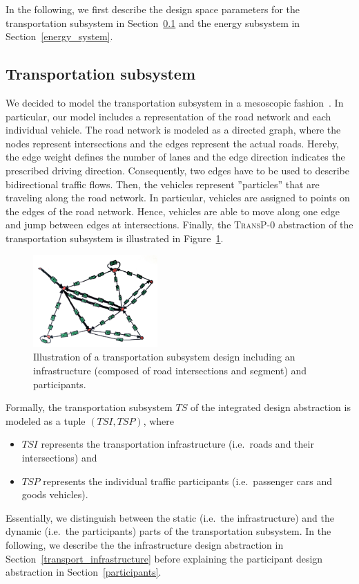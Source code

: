 In the following, we first describe the design space parameters for the transportation subsystem in Section~\ref{transport} and the energy subsystem in Section~\ref{energy_system}.

\subsection{Transportation subsystem}
\label{transport}

We decided to model the transportation subsystem in a mesoscopic fashion~\cite{?}. In particular, our model includes a representation of the road network and each individual vehicle. The road network is modeled as a directed graph, where the nodes represent intersections and the edges represent the actual roads. Hereby, the edge weight defines the number of lanes and the edge direction indicates the prescribed driving direction. Consequently, two edges have to be used to describe bidirectional traffic flows. Then, the vehicles represent ''particles'' that are traveling along the road network. In particular, vehicles are assigned to points on the edges of the road network. Hence, vehicles are able to move along one edge and jump between edges at intersections. Finally, the \textsc{TransP-0} abstraction of the transportation subsystem is illustrated in Figure~\ref{transport_illustration}.

\begin{figure}[h]
	\includegraphics[height=100pt, width=\columnwidth]{./gfx/transportation_system.jpg}
	\caption{Illustration of a transportation subsystem design including an infrastructure (composed of road intersections and segment) and participants.}
	\label{transport_illustration}
\end{figure}

Formally, the transportation subsystem $TS$ of the integrated design abstraction is modeled as a tuple $(TSI, TSP)$, where
\begin{itemize}
	\item $TSI$ represents the transportation infrastructure (i.e.\ roads and their intersections) and
	\item $TSP$ represents the individual traffic participants (i.e.\ passenger cars and goods vehicles).
\end{itemize}
Essentially, we distinguish between the static (i.e.\ the infrastructure) and the dynamic (i.e.\ the participants) parts of the transportation subsystem. In the following, we describe the the infrastructure design abstraction in Section~\ref{transport_infrastructure} before explaining the participant design abstraction in Section~\ref{participants}.

